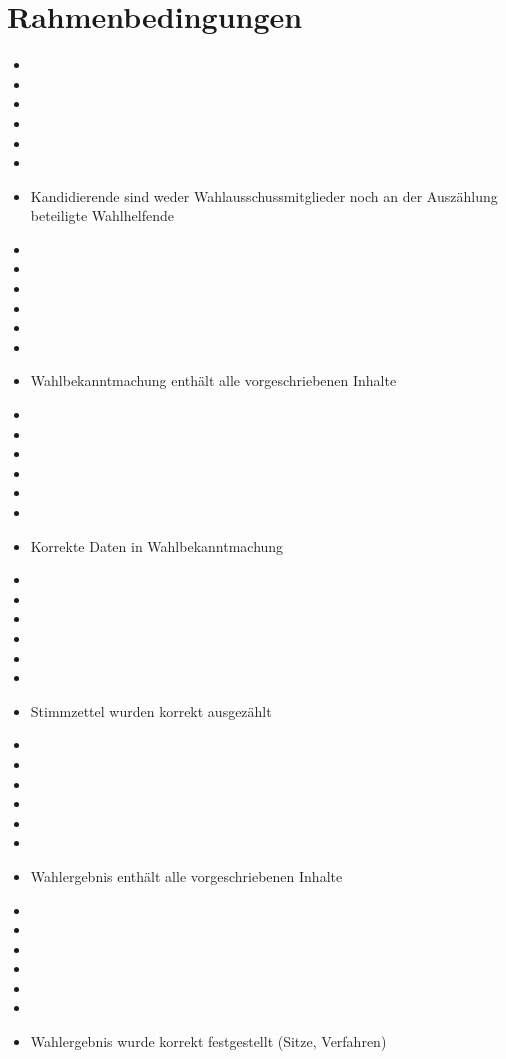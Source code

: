\documentclass[a4paper]{scrartcl}
\newcommand{\fullcheck}{\raisebox{-.8\dp\strutbox}{\texttt{[image: Check.pdf]}}}
\newcommand{\semicheck}{\raisebox{-.8\dp\strutbox}{\texttt{[image: Semicheck.pdf]}}}
\newcommand{\nocheck}{\raisebox{-.8\dp\strutbox}{\texttt{[image: Nocheck.pdf]}}}
\newcommand{\dontknow}{\raisebox{-.8\dp\strutbox}{\texttt{[image: Dontknow.pdf]}}}
\newcommand{\notrev}{\raisebox{-.8\dp\strutbox}{\texttt{[image: Notrev.pdf]}}}
\newcommand{\sym}[1]{
\ifcase#1 \item[$\Box$]
\or \item[\fullcheck]
\or \item[\semicheck]
\or \item[\nocheck]
\or \item[\dontknow]
\or \item[\notrev]
\else \item[$\Box$]
\fi}
\begin{document}


\section{Rahmenbedingungen}
\begin{itemize}[label=$\Box$]

\sym{4} Kandidierende sind weder Wahlausschussmitglieder noch an der Auszählung beteiligte Wahlhelfende
\sym{4} Wahlbekanntmachung enthält alle vorgeschriebenen Inhalte
\sym{4} Korrekte Daten in Wahlbekanntmachung
\sym{4} Stimmzettel wurden korrekt ausgezählt
\sym{1} Wahlergebnis enthält alle vorgeschriebenen Inhalte
\sym{4} Wahlergebnis wurde korrekt festgestellt (Sitze, Verfahren)
\end{itemize}









\end{document}
